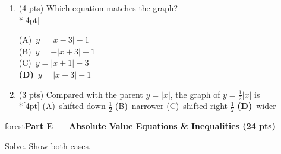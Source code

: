 \documentclass[12pt]{article}
\newcommand{\lgrid}[4]{%
  \draw[step=1, linegray!40, very thin] (#1,#3) grid (#2,#4);
  \draw[->, semithick, charcoal] (#1,0)--(#2,0) node[below right, font=\scriptsize]{$x$};
  \draw[->, semithick, charcoal] (0,#3)--(0,#4) node[left, font=\scriptsize]{$y$};}
\newcommand{\parthead}[1]{%
  \boxguard[10]\vspace{6pt}\noindent
  \begin{headlinebox}{forest}\color{white}\bfseries #1\end{headlinebox}%
  \vspace{4pt}}
\newcommand{\opt}[2]{(#1)~#2}
\newcommand{\optok}[2]{\mbox{\llap{\textcolor{keyred}{$\boldsymbol{\rightarrow}$}\,}\textcolor{keyred}{\textbf{(#1)}~#2}}}
\begin{document}
\begin{enumerate}[leftmargin=1.9em, itemsep=10pt, label=\arabic*., start=15]
  \item {}(4 pts) Which equation matches the graph?
    \\*[4pt]
    \begin{minipage}[c]{0.36\linewidth}\centering
    \end{minipage}%
    \begin{minipage}[c]{0.6\linewidth}
    \opt{A}{$y=|x-3|-1$} \\[6pt]
    \opt{B}{$y=-|x+3|-1$} \\[6pt]
    \opt{C}{$y=|x+1|-3$} \\[6pt]
    \optok{D}{$y=|x+3|-1$}
    \end{minipage}

  \item {}(3 pts) Compared with the parent $y=|x|$, the graph of $y=\tfrac{1}{2}|x|$ is
    \\*[4pt]
    \opt{A}{shifted down $\tfrac{1}{2}$} \hfill \opt{B}{narrower} \hfill
    \opt{C}{shifted right $\tfrac{1}{2}$} \hfill \optok{D}{wider}
\end{enumerate}

\parthead{Part E --- Absolute Value Equations \& Inequalities (24 pts)}
Solve. Show both cases.
\end{document}
